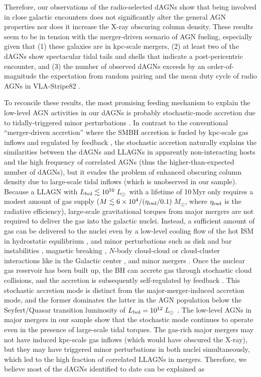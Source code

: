 \documentclass[iop,revtex4,twocolumn,apj,numberedappendix,appendixfloats]{emulateapj}
\newcommand{\msun}{$M_{\odot}$}
\newcommand{\lsun}{$L_{\odot}$}
\begin{document}
Therefore, our observations of the radio-selected dAGNs show that being involved in close galactic encounters does not significantly alter the general AGN properties nor does it increase the X-ray obscuring column density. These results seem to be in tension with the merger-driven scenario of AGN fueling, especially given that (1) these galaxies are in kpc-scale mergers, (2) at least two of the dAGNs show spectacular tidal tails and shells that indicate a post-pericentric encounter, and (3) the number of observed dAGNs exceeds by an order-of-magnitude the expectation from random pairing and the mean duty cycle of radio AGNs in VLA-Stripe82 . 

To reconcile these results, the most promising feeding mechanism to explain the low-level AGN activities in our dAGNs is probably stochastic-mode accretion due to tidally-triggered minor perturbations \citep[e.g.,][]{Hopkins06a}. In contrast to the conventional ``merger-driven accretion'' where the SMBH accretion is fueled by kpc-scale gas inflows and regulated by feedback \citep[e.g.,][]{Di-Matteo05,Hopkins05a}, the stochastic accretion naturally explains the similarities between the dAGNs and LLAGNs in apparently non-interacting hosts and the high frequency of correlated AGNs (thus the higher-than-expected number of dAGNs), but it evades the problem of enhanced obscuring column density due to large-scale tidal inflows (which is unobserved in our sample). Because a LLAGN with $L_{\rm bol} \lesssim 10^{10}$\,\lsun\ with a lifetime of 10\,Myr only requires a modest amount of gas supply ($M \lesssim 6\times10^4/(\eta_{\rm rad}/0.1)$\,\msun, where $\eta_{\rm rad}$ is the radiative efficiency), large-scale gravitational torques from major mergers are not required to deliver the gas into the galactic nuclei. Instead, a sufficient amount of gas can be delivered to the nuclei even by a low-level cooling flow of the hot ISM in hydrostatic equilibrium \citep[e.g.,][]{Allen06}, and minor perturbations such as disk and bar instabilities \citep[e.g.,][]{Norman83,Jogee06}, magnetic breaking \citep[e.g.,][]{Krolik90}, $N$-body cloud-cloud or cloud-cluster interactions like in the Galactic center \citep[e.g.,][]{Genzel94}, and minor mergers \citep[e.g.,][]{Hernquist95}. Once the nuclear gas reservoir has been built up, the BH can accrete gas through stochastic cloud collisions, and the accretion is subsequently self-regulated by feedback \citep[e.g.,][]{Yuan11,Bu19} . This stochastic accretion mode is distinct from the major-merger-induced accretion mode, and the former dominates the latter in the AGN population below the Seyfert/Quasar transition luminosity of $L_{\rm bol} = 10^{12}$\,\lsun\ \citep{Hopkins14a}. The low-level AGNs in major mergers in our sample show that the stochastic mode continues to operate even in the presence of large-scale tidal torques. The gas-rich major mergers may not have induced kpc-scale gas inflows (which would have obscured the X-ray), but they may have triggered minor perturbations in both nuclei simultaneously, which led to the high fraction of correlated LLAGNs in mergers. Therefore, we believe most of the dAGNs identified to date can be explained as 
\end{document}
